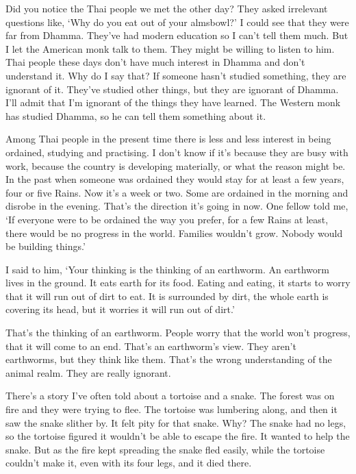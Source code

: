 Did you notice the Thai people we met the other day? They asked irrelevant questions like, `Why do you eat out of your almsbowl?' I could see that they were far from Dhamma. They've had modern education so I can't tell them much. But I let the American monk talk to them. They might be willing to listen to him. Thai people these days don't have much interest in Dhamma and don't understand it. Why do I say that? If someone hasn't studied something, they are ignorant of it. They've studied other things, but they are ignorant of Dhamma. I'll admit that I'm ignorant of the things they have learned. The Western monk has studied Dhamma, so he can tell them something about it.

Among Thai people in the present time there is less and less interest in being ordained, studying and practising. I don't know if it's because they are busy with work, because the country is developing materially, or what the reason might be. In the past when someone was ordained they would stay for at least a few years, four or five Rains. Now it's a week or two. Some are ordained in the morning and disrobe in the evening. That's the direction it's going in now. One fellow told me, `If everyone were to be ordained the way you prefer, for a few Rains at least, there would be no progress in the world. Families wouldn't grow. Nobody would be building things.'

I said to him, `Your thinking is the thinking of an earthworm. An earthworm lives in the ground. It eats earth for its food. Eating and eating, it starts to worry that it will run out of dirt to eat. It is surrounded by dirt, the whole earth is covering its head, but it worries it will run out of dirt.'

That's the thinking of an earthworm. People worry that the world won't progress, that it will come to an end. That's an earthworm's view. They aren't earthworms, but they think like them. That's the wrong understanding of the animal realm. They are really ignorant.

There's a story I've often told about a tortoise and a snake. The forest was on fire and they were trying to flee. The tortoise was lumbering along, and then it saw the snake slither by. It felt pity for that snake. Why? The snake had no legs, so the tortoise figured it wouldn't be able to escape the fire. It wanted to help the snake. But as the fire kept spreading the snake fled easily, while the tortoise couldn't make it, even with its four legs, and it died there.

